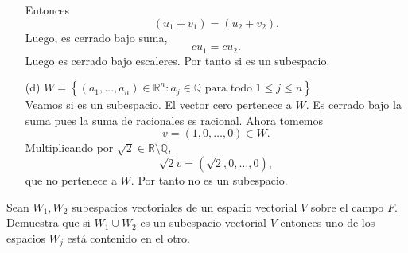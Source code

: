\documentclass[12pt,a4paper]{article}
\begin{document}
\begin{solucion}
\begin{enumerate}
            Entonces
            \begin{equation*}
                (u_{1}+v_{1})=(u_{2}+v_{2}).
            \end{equation*}
            Luego, es cerrado bajo suma,
            \begin{equation*}
                cu_{1}=cu_{2}.
            \end{equation*}
            Luego es cerrado bajo escaleres. Por tanto si es un subespacio.
            \item[(d)] $W=\left\{(a_{1},\dots,a_{n})\in\mathbb{R}^{n}:a_{j}\in\mathbb{Q}\text{ para todo }1\leq j\leq n\right\}$\\
            Veamos si es un subespacio. El vector cero pertenece a $W$. Es cerrado bajo la suma pues la suma de racionales es racional.
            Ahora tomemos
            \begin{equation*}
                v=(1,0,\dots,0)\in W.
            \end{equation*}
            Multiplicando por $\sqrt{2}\in\mathbb{R}\setminus\mathbb{Q}$,
            \begin{equation*}
                \sqrt{2}v=(\sqrt{2},0,\dots,0),
            \end{equation*}
            que no pertenece a $W$. Por tanto no es un subespacio.
        \end{enumerate}
    \end{solucion}

    \begin{mdframed}[style=mdbluebox,frametitle={Ejercicio 4}]
        Sean $W_{1},W_{2}$ subespacios vectoriales de un espacio vectorial $V$ sobre el campo
        $F$. Demuestra que si $W_{1}\cup W_{2}$ es un subespacio vectorial $V$ entonces uno de los espacios
        $W_{j}$ está contenido en el otro.
    \end{mdframed}
\end{document}
